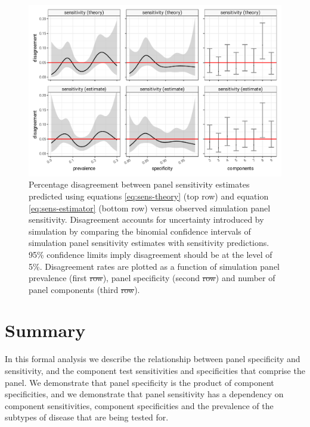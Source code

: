 \documentclass[a4paper, 12pt, twoside]{article}
\let\Oldsection\section
\renewcommand{\section}{\FloatBarrier\Oldsection}
\providecommand{\DIFaddtex}[1]{{\protect\color{blue}\uwave{#1}}} %
\providecommand{\DIFdeltex}[1]{{\protect\color{red}\sout{#1}}}                      %
\providecommand{\DIFaddFL}[1]{\DIFadd{#1}} %
\providecommand{\DIFdelFL}[1]{\DIFdel{#1}} %
\providecommand{\DIFaddbeginFL}{} %
\providecommand{\DIFaddendFL}{} %
\providecommand{\DIFdelbeginFL}{} %
\providecommand{\DIFdelendFL}{} %
\providecommand{\DIFadd}[1]{\texorpdfstring{\DIFaddtex{#1}}{#1}} %
\providecommand{\DIFdel}[1]{\texorpdfstring{\DIFdeltex{#1}}{}} %
\begin{document}
\begin{figure}[h!]
\centering
  \includegraphics{fig/calibration-prediction-v-simulation.png}
  \caption{Percentage disagreement between panel sensitivity estimates predicted using equations \eqref{eq:sens-theory} (top row) and equation \eqref{eq:sens-estimator} (bottom row) versus observed simulation panel sensitivity. Disagreement accounts for uncertainty introduced by simulation by comparing the binomial confidence intervals of simulation panel sensitivity estimates with sensitivity predictions. 95\% confidence limits imply disagreement should be at the level of 5\%. Disagreement rates are plotted as a function of simulation panel prevalence (first \DIFdelbeginFL \DIFdelFL{row}\DIFdelendFL \DIFaddbeginFL \DIFaddFL{column}\DIFaddendFL ), panel specificity (second \DIFdelbeginFL \DIFdelFL{row}\DIFdelendFL \DIFaddbeginFL \DIFaddFL{column}\DIFaddendFL ) and number of panel components (third \DIFdelbeginFL \DIFdelFL{row}\DIFdelendFL \DIFaddbeginFL \DIFaddFL{column}\DIFaddendFL ).}
\label{fig:A6}
\end{figure}

\section{Summary}

In this formal analysis we describe the relationship between panel specificity and sensitivity, and the component test sensitivities and specificities that comprise the panel. We demonstrate that panel specificity is the product of component specificities, and we demonstrate that panel sensitivity has a dependency on component sensitivities, component specificities and the prevalence of the subtypes of disease that are being tested for.
\end{document}
